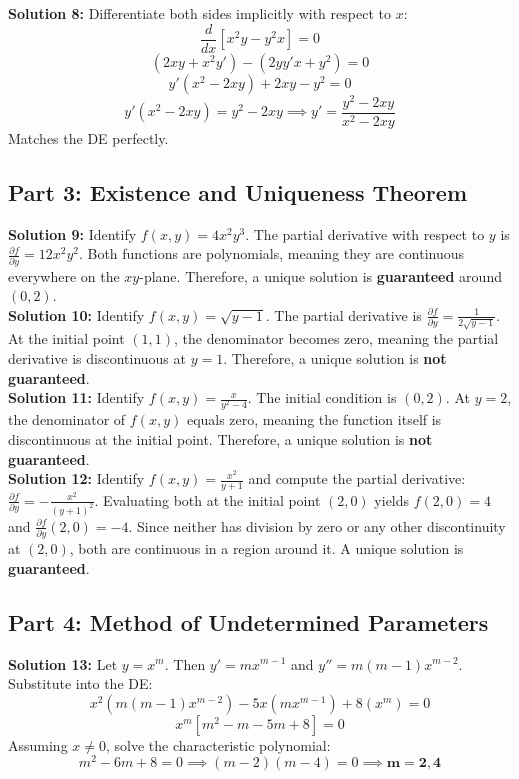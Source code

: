 \documentclass[12pt]{article}
\begin{document}
\noindent \textbf{Solution 8:} Differentiate both sides implicitly with respect to $x$:
$$\frac{d}{dx}[x^2 y - y^2 x] = 0$$
$$(2x y + x^2 y') - (2y y' x + y^2) = 0$$
$$y'(x^2 - 2xy) + 2xy - y^2 = 0$$
$$y'(x^2 - 2xy) = y^2 - 2xy \implies y' = \frac{y^2 - 2xy}{x^2 - 2xy}$$
Matches the DE perfectly.

\subsection*{Part 3: Existence and Uniqueness Theorem}
\textbf{Solution 9:} Identify $f(x,y) = 4x^2 y^3$. The partial derivative with respect to $y$ is $\frac{\partial f}{\partial y} = 12x^2 y^2$. Both functions are polynomials, meaning they are continuous everywhere on the $xy$-plane. Therefore, a unique solution is \textbf{guaranteed} around $(0,2)$. \\

\noindent \textbf{Solution 10:} Identify $f(x,y) = \sqrt{y - 1}$. The partial derivative is $\frac{\partial f}{\partial y} = \frac{1}{2\sqrt{y - 1}}$. At the initial point $(1,1)$, the denominator becomes zero, meaning the partial derivative is discontinuous at $y=1$. Therefore, a unique solution is \textbf{not guaranteed}. \\

\noindent \textbf{Solution 11:} Identify $f(x,y) = \frac{x}{y^2 - 4}$. The initial condition is $(0,2)$. At $y=2$, the denominator of $f(x,y)$ equals zero, meaning the function itself is discontinuous at the initial point. Therefore, a unique solution is \textbf{not guaranteed}. \\

\noindent \textbf{Solution 12:} Identify $f(x,y) = \frac{x^2}{y + 1}$ and compute the partial derivative: $\frac{\partial f}{\partial y} = -\frac{x^2}{(y+1)^2}$. Evaluating both at the initial point $(2,0)$ yields $f(2,0) = 4$ and $\frac{\partial f}{\partial y}(2,0) = -4$. Since neither has division by zero or any other discontinuity at $(2,0)$, both are continuous in a region around it. A unique solution is \textbf{guaranteed}.

\subsection*{Part 4: Method of Undetermined Parameters}
\textbf{Solution 13:} Let $y = x^m$. Then $y' = m x^{m-1}$ and $y'' = m(m-1)x^{m-2}$. Substitute into the DE:
$$x^2(m(m-1)x^{m-2}) - 5x(m x^{m-1}) + 8(x^m) = 0$$
$$x^m [m^2 - m - 5m + 8] = 0$$
Assuming $x \neq 0$, solve the characteristic polynomial:
$$m^2 - 6m + 8 = 0 \implies (m-2)(m-4) = 0 \implies \mathbf{m = 2, 4}$$
\end{document}
